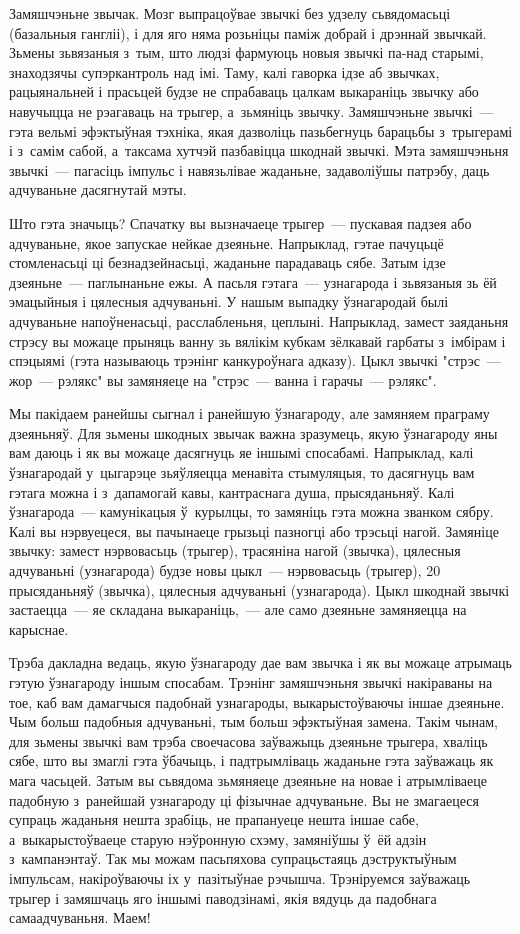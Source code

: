 Замяшчэньне звычак. Мозг выпрацоўвае звычкі без удзелу сьвядомасьці (базальныя гангліі), і для яго няма розьніцы паміж добрай і дрэннай звычкай. Зьмены зьвязаныя з~тым, што людзі фармуюць новыя звычкі па-над старымі, знаходзячы супэркантроль над імі. Таму, калі гаворка ідзе аб звычках, рацыянальней і прасьцей будзе не спрабаваць цалкам выкараніць звычку або навучыцца не рэагаваць на трыгер, а~зьмяніць звычку. Замяшчэньне звычкі~--- гэта вельмі эфэктыўная тэхніка, якая дазволіць пазьбегнуць барацьбы з~трыгерамі і з~самім сабой, а~таксама хутчэй пазбавіцца шкоднай звычкі. Мэта замяшчэньня звычкі~--- пагасіць імпульс і навязьлівае жаданьне, задаволіўшы патрэбу, даць адчуваньне дасягнутай мэты.

Што гэта значыць? Спачатку вы вызначаеце трыгер~--- пускавая падзея або адчуваньне, якое запускае нейкае дзеяньне. Напрыклад, гэтае пачуцьцё стомленасьці ці безнадзейнасьці, жаданьне парадаваць сябе. Затым ідзе дзеяньне~--- паглынаньне ежы. А пасьля гэтага~--- узнагарода і зьвязаныя зь ёй эмацыйныя і цялесныя адчуваньні. У нашым выпадку ўзнагародай былі адчуваньне напоўненасьці, расслабленьня, цеплыні. Напрыклад, замест заяданьня стрэсу вы можаце прыняць ванну зь вялікім кубкам зёлкавай гарбаты з~імбірам і спэцыямі (гэта называюць трэнінг канкуроўнага адказу). Цыкл звычкі "стрэс~--- жор~--- рэлякс" вы замяняеце на "стрэс~--- ванна і гарачы~--- рэлякс".

Мы пакідаем ранейшы сыгнал і ранейшую ўзнагароду, але замяняем праграму дзеяньняў. Для зьмены шкодных звычак важна зразумець, якую ўзнагароду яны вам даюць і як вы можаце дасягнуць яе іншымі спосабамі. Напрыклад, калі ўзнагародай у~цыгарэце зьяўляецца менавіта стымуляцыя, то дасягнуць вам гэтага можна і з~дапамогай кавы, кантраснага душа, прысяданьняў. Калі ўзнагарода~--- камунікацыя ў~курылцы, то замяніць гэта можна званком сябру. Калі вы нэрвуецеся, вы пачынаеце грызьці пазногці або трэсьці нагой. Замяніце звычку: замест нэрвовасьць (трыгер), трасяніна нагой (звычка), цялесныя адчуваньні (узнагарода) будзе новы цыкл~--- нэрвовасьць (трыгер), 20 прысяданьняў (звычка), цялесныя адчуваньні (узнагарода). Цыкл шкоднай звычкі застаецца~--- яе складана выкараніць,~--- але само дзеяньне замяняецца на карыснае.

Трэба дакладна ведаць, якую ўзнагароду дае вам звычка і як вы можаце атрымаць гэтую ўзнагароду іншым спосабам. Трэнінг замяшчэньня звычкі накіраваны на тое, каб вам дамагчыся падобнай узнагароды, выкарыстоўваючы іншае дзеяньне. Чым больш падобныя адчуваньні, тым больш эфэктыўная замена. Такім чынам, для зьмены звычкі вам трэба своечасова заўважыць дзеяньне трыгера, хваліць сябе, што вы змаглі гэта ўбачыць, і падтрымліваць жаданьне гэта заўважаць як мага часьцей. Затым вы сьвядома зьмяняеце дзеяньне на новае і атрымліваеце падобную з~ранейшай узнагароду ці фізычнае адчуваньне. Вы не змагаецеся супраць жаданьня нешта зрабіць, не прапануеце нешта іншае сабе, а~выкарыстоўваеце старую нэўронную схэму, замяніўшы ў~ёй адзін з~кампанэнтаў. Так мы можам пасьпяхова супрацьстаяць дэструктыўным імпульсам, накіроўваючы іх у~пазітыўнае рэчышча. Трэніруемся заўважаць трыгер і замяшчаць яго іншымі паводзінамі, якія вядуць да падобнага самаадчуваньня. Маем!

